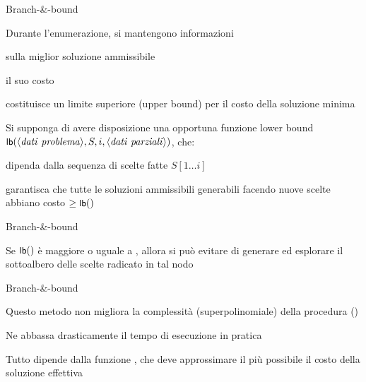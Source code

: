\begin{frame}{Branch-\&-bound}

\vspace{-9pt}
\begin{myboxtitle}
\BIL
\item Durante l'enumerazione, si mantengono informazioni 
\BI
\item sulla miglior soluzione ammissibile \alert{\Minsol} 
\item il suo costo \alert{\Mincost}
\EI
\item \Mincost costituisce un \alert{limite superiore} (\alert{upper bound})
per il costo della soluzione minima
\EIL
\end{myboxtitle}

\begin{myboxtitle}
\BIL
\item Si supponga di avere disposizione una opportuna funzione \alert{lower bound} $\textsf{{\small lb}}(\langle \mathit{dati\ problema} \rangle, S, i, \langle \mathit{dati\ parziali} \rangle)$, che:
  \BI 
  \item dipenda dalla sequenza di scelte fatte $S[1  \ldots i]$
  \item garantisca che tutte le soluzioni ammissibili generabili facendo
nuove scelte abbiano costo $\geq \textsf{{\small lb}}()$
  \EI
\EIL
\end{myboxtitle}
    
\end{frame}

\begin{frame}{Branch-\&-bound}

\vspace{-9pt}
\begin{myboxtitle}[Potatura]
Se $\textsf{{\small lb}}()$ è maggiore o uguale a \Mincost, allora si può
evitare di generare ed esplorare il sottoalbero delle scelte radicato in tal nodo
\end{myboxtitle}

\end{frame}

\begin{frame}{Branch-\&-bound}

\vspace{-9pt}
\begin{myboxtitle}[Note]
\BIL
\item Questo metodo non migliora la complessità (superpolinomiale) della procedura \enumerazione()
\item Ne abbassa drasticamente il tempo di esecuzione in pratica
\item Tutto dipende dalla funzione \LB, che deve approssimare il più  possibile il costo della soluzione effettiva
\EIL
\end{myboxtitle}

\end{frame}

